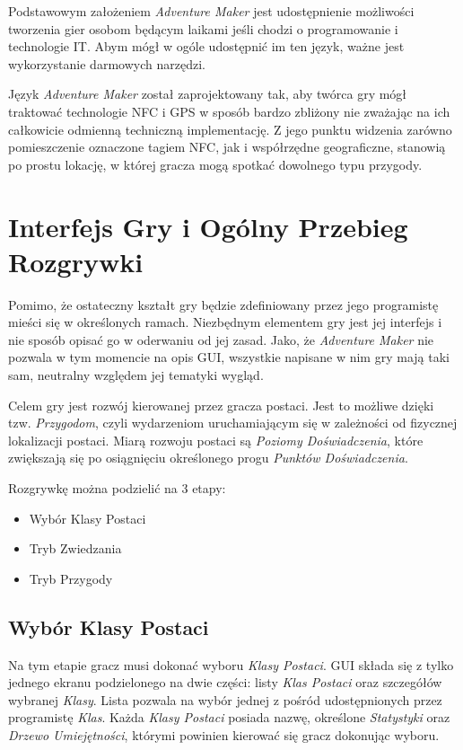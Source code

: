 \documentclass[openright]{xmgr}
\begin{document}
Podstawowym założeniem \textit{Adventure Maker} jest udostępnienie możliwości tworzenia gier osobom będącym laikami jeśli chodzi o programowanie i technologie IT. Abym mógł w ogóle udostępnić im ten język, ważne jest wykorzystanie darmowych narzędzi.

Język \textit{Adventure Maker} został zaprojektowany tak, aby twórca gry mógł traktować technologie NFC i GPS w sposób bardzo zbliżony nie zważając na ich  całkowicie odmienną techniczną implementację. Z jego punktu widzenia zarówno pomieszczenie oznaczone tagiem NFC, jak i współrzędne geograficzne, stanowią po prostu lokację, w której gracza mogą spotkać dowolnego typu przygody. 

\chapter{Interfejs Gry i Ogólny Przebieg Rozgrywki}

Pomimo, że ostateczny kształt gry będzie zdefiniowany przez jego programistę mieści się w określonych ramach. Niezbędnym elementem gry jest jej interfejs i nie sposób opisać go w oderwaniu od jej zasad. Jako, że \textit{Adventure Maker} nie pozwala w tym momencie na opis GUI, wszystkie napisane w nim gry mają taki sam, neutralny względem jej tematyki wygląd.

Celem gry jest rozwój kierowanej przez gracza postaci. Jest to możliwe dzięki tzw. \textit{Przygodom}, czyli wydarzeniom uruchamiającym się w zależności od fizycznej lokalizacji postaci. Miarą rozwoju postaci są \textit{Poziomy Doświadczenia}, które zwiększają się po osiągnięciu określonego progu \textit{Punktów Doświadczenia}.

Rozgrywkę można podzielić na 3 etapy:
\begin{itemize}
	\item Wybór Klasy Postaci
	\item Tryb Zwiedzania
	\item Tryb Przygody 
\end{itemize}
\section{Wybór Klasy Postaci}

Na tym etapie gracz musi dokonać wyboru \textit{Klasy Postaci}. GUI składa się z tylko jednego ekranu podzielonego na dwie części: listy \textit{Klas Postaci} oraz szczegółów wybranej \textit{Klasy}. Lista pozwala na wybór jednej z pośród udostępnionych przez programistę \textit{Klas}. Każda \textit{Klasy Postaci} posiada nazwę, określone \textit{Statystyki} oraz \textit{Drzewo Umiejętności}, którymi powinien kierować się gracz dokonując wyboru.
\end{document}
